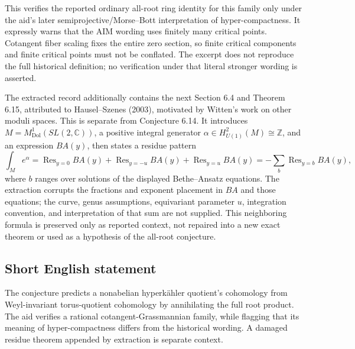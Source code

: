 \documentclass[11pt]{article}
\newcommand{\Z}{\mathbb{Z}}
\newcommand{\C}{\mathbb{C}}
\begin{document}
This verifies the reported ordinary all-root ring identity for this family only under the aid's later semiprojective/Morse--Bott interpretation of hyper-compactness. It expressly warns that the AIM wording uses finitely many critical points. Cotangent fiber scaling fixes the entire zero section, so finite critical components and finite critical points must not be conflated. The excerpt does not reproduce the full historical definition; no verification under that literal stronger wording is asserted.

The extracted record additionally contains the next Section 6.4 and Theorem 6.15, attributed to Hausel--Szenes (2003), motivated by Witten's work on other moduli spaces. This is separate from Conjecture 6.14. It introduces \(M=M^1_{\mathrm{Dol}}(SL(2,\C))\), a positive integral generator \(\alpha\in H^2_{U(1)}(M)\cong\Z\), and an expression \(BA(y)\), then states a residue pattern
\[
 \int_M e^\alpha=
 \operatorname{Res}_{y=0}BA(y)+\operatorname{Res}_{y=-u}BA(y)
 +\operatorname{Res}_{y=u}BA(y)
 =-\sum_b\operatorname{Res}_{y=b}BA(y),
\]
where \(b\) ranges over solutions of the displayed Bethe--Ansatz equations. The extraction corrupts the fractions and exponent placement in \(BA\) and those equations; the curve, genus assumptions, equivariant parameter \(u\), integration convention, and interpretation of that sum are not supplied. This neighboring formula is preserved only as reported context, not repaired into a new exact theorem or used as a hypothesis of the all-root conjecture.
\subsection{Short English statement}
The conjecture predicts a nonabelian hyperkähler quotient's cohomology from Weyl-invariant torus-quotient cohomology by annihilating the full root product. The aid verifies a rational cotangent-Grassmannian family, while flagging that its meaning of hyper-compactness differs from the historical wording. A damaged residue theorem appended by extraction is separate context.
\end{document}
